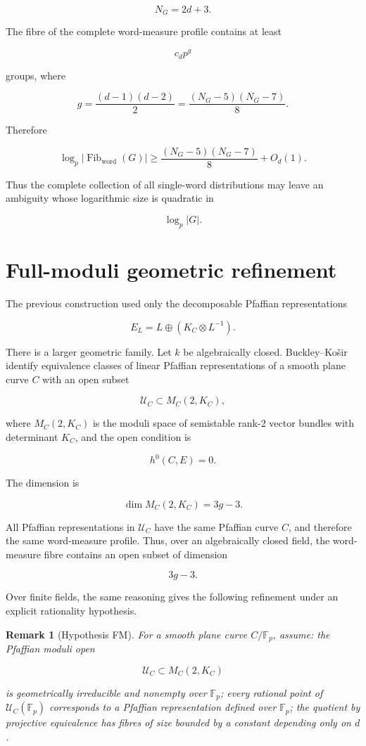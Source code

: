 \documentclass[11pt]{article}
\newtheorem{remark}[theorem]{Remark}
\begin{document}
\[
N_G=2d+3.
\]

The fibre of the complete word-measure profile contains at least

\[
c_d p^g
\]

groups, where

\[
g=\frac{(d-1)(d-2)}2
=\frac{(N_G-5)(N_G-7)}8.
\]

Therefore

\[
\log_p |\operatorname{Fib}_{\mathrm{word}}(G)|
\ge
\frac{(N_G-5)(N_G-7)}8+O_d(1).
\]

Thus the complete collection of all single-word distributions may leave an ambiguity whose logarithmic size is quadratic in

\[
\log_p|G|.
\]

\section{Full-moduli geometric refinement}

The previous construction used only the decomposable Pfaffian representations

\[
E_L=L\oplus(K_C\otimes L^{-1}).
\]

There is a larger geometric family. Let $k$ be algebraically closed. Buckley--Košir identify equivalence classes of linear Pfaffian representations of a smooth plane curve $C$ with an open subset

\[
\mathcal U_C\subset M_C(2,K_C),
\]

where $M_C(2,K_C)$ is the moduli space of semistable rank-$2$ vector bundles with determinant $K_C$, and the open condition is

\[
h^0(C,E)=0.
\]

The dimension is

\[
\dim M_C(2,K_C)=3g-3.
\]

All Pfaffian representations in $\mathcal U_C$ have the same Pfaffian curve $C$, and therefore the same word-measure profile. Thus, over an algebraically closed field, the word-measure fibre contains an open subset of dimension

\[
3g-3.
\]

Over finite fields, the same reasoning gives the following refinement under an explicit rationality hypothesis.

\begin{remark}[Hypothesis FM]
For a smooth plane curve $C/\mathbb F_p$, assume: the Pfaffian moduli open

\[
\mathcal U_C\subset M_C(2,K_C)
\]

is geometrically irreducible and nonempty over $\mathbb F_p$; every rational point of $\mathcal U_C(\mathbb F_p)$ corresponds to a Pfaffian representation defined over $\mathbb F_p$; the quotient by projective equivalence has fibres of size bounded by a constant depending only on $d$.

\end{remark}
\end{document}

